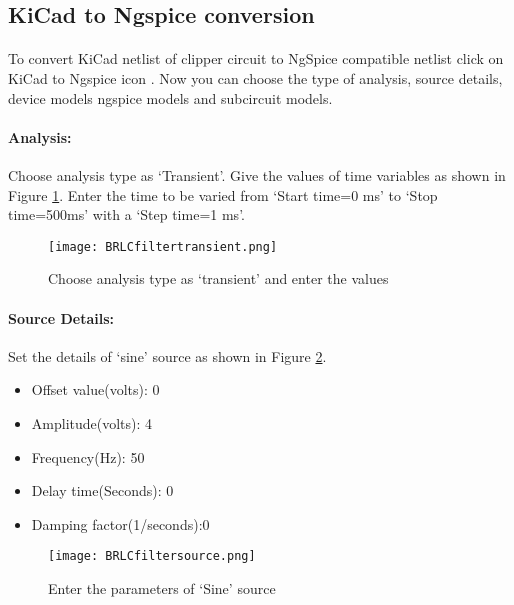 \subsection*{KiCad to Ngspice conversion}

\paragraph{} To convert KiCad netlist of clipper circuit to NgSpice
compatible netlist click on KiCad to Ngspice icon .  Now you can choose the type of analysis, source details, device models ngspice models and subcircuit models.


%

\paragraph{Analysis:}Choose analysis type as `Transient'. Give the values of time variables as shown in Figure \ref{BRLCfiltertransient}. Enter the time to be varied from `Start time=0 ms' to `Stop time=500ms' with a `Step time=1 ms'.

\begin{figure}[h]
\centering
\texttt{[image: BRLCfiltertransient.png]}
\caption{Choose analysis type as `transient' and enter the values}
\label{BRLCfiltertransient}
\end{figure}

\paragraph{Source Details:} Set the details of `sine' source as shown in Figure \ref{BRLCfiltersource}.
\begin{itemize}
\item
Offset value(volts): 0
\item
Amplitude(volts): 4
\item
Frequency(Hz): 50
\item
Delay time(Seconds): 0
\item
Damping factor(1/seconds):0

\end{itemize}
\begin{figure}[h]
\centering
\texttt{[image: BRLCfiltersource.png]}
\caption{Enter the parameters of `Sine' source}
\label{BRLCfiltersource}
\end{figure}


